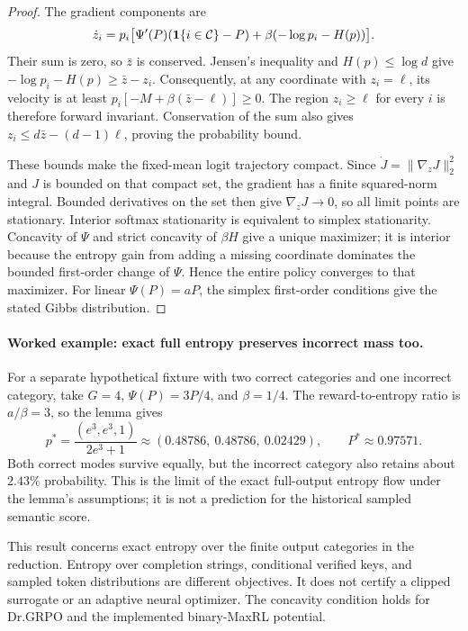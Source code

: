 \begin{proof}
The gradient components are
\[
 \dot z_i=p_i\bigl[\Psi'(P)(\mathbf 1\{i\in\mathcal C\}-P)
       +\beta(-\log p_i-H(p))\bigr].
\]
Their sum is zero, so $\bar z$ is conserved. Jensen's inequality and
$H(p)\le\log d$ give
$-\log p_i-H(p)\ge\bar z-z_i$.
Consequently, at any coordinate with $z_i=\ell$, its velocity is at least
$p_i[-M+\beta(\bar z-\ell)]\ge0$. The region $z_i\ge\ell$ for every $i$
is therefore forward invariant. Conservation of the sum also gives
$z_i\le d\bar z-(d-1)\ell$, proving the probability bound.

These bounds make the fixed-mean logit trajectory compact.
Since $\dot J=\|\nabla_zJ\|_2^2$ and $J$ is bounded on that compact set,
the gradient has a finite squared-norm integral. Bounded derivatives on the
set then give $\nabla_zJ\to0$, so all limit points are stationary.
Interior softmax stationarity is equivalent to simplex stationarity.
Concavity of $\Psi$ and strict concavity of $\beta H$ give a unique maximizer;
it is interior because the entropy gain from adding a missing coordinate
dominates the bounded first-order change of $\Psi$. Hence the entire policy
converges to that maximizer. For linear $\Psi(P)=aP$, the simplex
first-order conditions give the stated Gibbs distribution.
\end{proof}

\paragraph{Worked example: exact full entropy preserves incorrect mass too.}
For a separate hypothetical fixture with two correct categories and one
incorrect category, take $G=4$, $\Psi(P)=3P/4$, and $\beta=1/4$.
The reward-to-entropy ratio is $a/\beta=3$, so the lemma gives
\[
 p^*=\frac{(e^3,e^3,1)}{2e^3+1}
       \approx(0.48786,\ 0.48786,\ 0.02429),
 \qquad P^*\approx0.97571.
\]
Both correct modes survive equally, but the incorrect category also retains
about $2.43\%$ probability. This is the limit of the exact full-output
entropy flow under the lemma's assumptions; it is not a prediction for the
historical sampled semantic score.

This result concerns exact entropy over the finite output categories in the
reduction. Entropy over completion strings, conditional verified keys, and
sampled token distributions are different objectives. It does not certify a
clipped surrogate or an adaptive neural optimizer. The concavity condition
holds for Dr.GRPO and the implemented binary-MaxRL potential.

